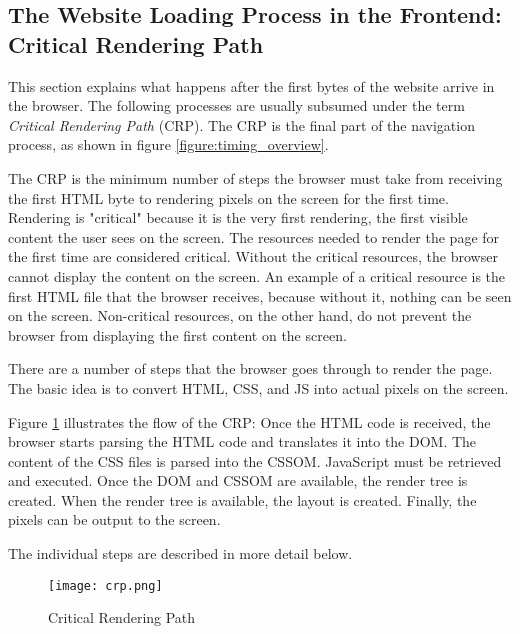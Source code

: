 \subsection{The Website Loading Process in the Frontend: Critical Rendering Path} %
\label{subsection:crp}

This section explains what happens after the first bytes of the website arrive in the browser.
The following processes are usually subsumed under the term \textit{Critical Rendering Path} (CRP).
The CRP is the final part of the navigation process, as shown in figure \ref{figure:timing_overview}.



The CRP is the minimum number of steps the browser must take from receiving the first HTML byte to rendering pixels on the screen for the first time.
Rendering is "critical" because it is the very first rendering, the first visible content the user sees on the screen.
The resources needed to render the page for the first time are considered critical.
Without the critical resources, the browser cannot display the content on the screen.
An example of a critical resource is the first HTML file that the browser receives, because without it, nothing can be seen on the screen.
Non-critical resources, on the other hand, do not prevent the browser from displaying the first content on the screen. %




There are a number of steps that the browser goes through to render the page.
The basic idea is to convert HTML, CSS, and JS into actual pixels on the screen.

Figure \ref{img:crp} illustrates the flow of the CRP:
Once the HTML code is received, the browser starts parsing the HTML code and translates it into the DOM.
The content of the CSS files is parsed into the CSSOM.
JavaScript must be retrieved and executed.
Once the DOM and CSSOM are available, the render tree is created.
When the render tree is available, the layout is created.
Finally, the pixels can be output to the screen.

The individual steps are described in more detail below.


\begin{figure}[h!]
\begin{center}
\texttt{[image: crp.png]}
\caption{Critical Rendering Path}
\label{img:crp}
\end{center}
\end{figure}



